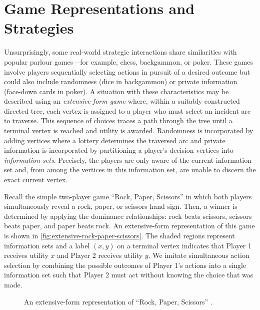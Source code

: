 \section{Game Representations and Strategies} \label{sec:game-representations-and-strategies}
    Unsurprisingly, some real-world strategic interactions share similarities with popular parlour games---for example, chess, backgammon, or poker.
    These games involve players sequentially selecting actions in pursuit of a desired outcome but could also include randomness (dice in backgammon) or private information (face-down cards in poker).
    A situation with these characteristics may be described using an \emph{extensive-form game} where, within a suitably constructed directed tree, each vertex is assigned to a player who must select an incident arc to traverse.
    This sequence of choices traces a path through the tree until a terminal vertex is reached and utility is awarded.
    Randomness is incorporated by adding vertices where a lottery determines the traversed arc and private information is incorporated by partitioning a player's decision vertices into \emph{information sets}.
    Precisely, the players are only aware of the current information set and, from among the vertices in this information set, are unable to discern the exact current vertex.

    Recall the simple two-player game ``Rock, Paper, Scissors'' in which both players simultaneously reveal a rock, paper, or scissors hand sign.
    Then, a winner is determined by applying the dominance relationships: rock beats scissors, scissors beats paper, and paper beats rock.
    An extensive-form representation of this game is shown in \autoref{fig:extensive-rock-paper-scissors}.
    The shaded regions represent information sets and a label $(x, y)$ on a terminal vertex indicates that Player 1 receives utility $x$ and Player 2 receives utility $y$.
    We imitate simultaneous action selection by combining the possible outcomes of Player 1's actions into a single information set such that Player 2 must act without knowing the choice that was made.


    \begin{figure}[t]
        \centering
        
        \caption[``Rock, Paper, Scissors'' in Extensive Form]{An extensive-form representation of ``Rock, Paper, Scissors'' \parencite{Maschler2013}.}
        \label{fig:extensive-rock-paper-scissors}
    \end{figure}

